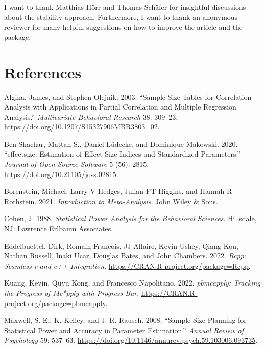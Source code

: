 I want to thank Matthias Hörr and Thomas Schäfer for insightful discussions about the stability approach. Furthermore, I want to thank an anonymous reviewer for many helpful suggestions on how to improve the article and the package.

\hypertarget{references}{%
\section*{References}\label{references}}

\hypertarget{refs}{}
\begin{CSLReferences}{1}{0}
\leavevmode{}%
Algina, James, and Stephen Olejnik. 2003. {``Sample Size Tables for Correlation Analysis with Applications in Partial Correlation and Multiple Regression Analysis.''} \emph{Multivariate Behavioral Research} 38: 309--23. \url{https://doi.org/10.1207/S15327906MBR3803_02}.

\leavevmode{}%
Ben-Shachar, Mattan S., Daniel Lüdecke, and Dominique Makowski. 2020. {``{e}ffectsize: Estimation of Effect Size Indices and Standardized Parameters.''} \emph{Journal of Open Source Software} 5 (56): 2815. \url{https://doi.org/10.21105/joss.02815}.

\leavevmode{}%
Borenstein, Michael, Larry V Hedges, Julian PT Higgins, and Hannah R Rothstein. 2021. \emph{Introduction to Meta-Analysis}. John Wiley \& Sons.

\leavevmode{}%
Cohen, J. 1988. \emph{Statistical Power Analysis for the Behavioral Sciences}. {Hillsdale, NJ}: {Lawrence Erlbaum Associates}.

\leavevmode{}%
Eddelbuettel, Dirk, Romain Francois, JJ Allaire, Kevin Ushey, Qiang Kou, Nathan Russell, Inaki Ucar, Douglas Bates, and John Chambers. 2022. \emph{Rcpp: Seamless r and c++ Integration}. \url{https://CRAN.R-project.org/package=Rcpp}.

\leavevmode{}%
Kuang, Kevin, Quyu Kong, and Francesco Napolitano. 2022. \emph{{pbmcapply}: Tracking the Progress of Mc*pply with Progress Bar}. \url{https://CRAN.R-project.org/package=pbmcapply}.

\leavevmode{}%
Maxwell, S. E., K. Kelley, and J. R. Rausch. 2008. {``Sample Size Planning for Statistical Power and Accuracy in Parameter Estimation.''} \emph{Annual Review of Psychology} 59: 537--63. \url{https://doi.org/10.1146/annurev.psych.59.103006.093735}.


\end{CSLReferences}
